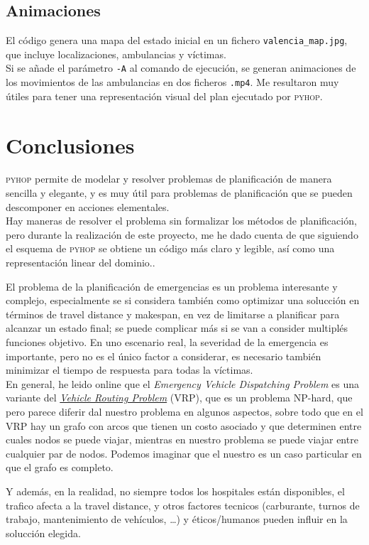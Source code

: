 \subsection{Animaciones}

El código genera una mapa del estado inicial en un fichero \texttt{valencia\_map.jpg}, que incluye localizaciones, ambulancias y víctimas.\\
Si se añade el parámetro \texttt{-A} al comando de ejecución, se generan animaciones de los movimientos de las ambulancias en dos ficheros \texttt{.mp4}.
Me resultaron muy útiles para tener una representación visual del plan ejecutado por \textsc{pyhop}.


\section{Conclusiones}

\textsc{pyhop} permite de modelar y resolver problemas de planificación de manera sencilla y elegante, y es muy útil para problemas de planificación que se pueden descomponer en acciones elementales.\\
Hay maneras de resolver el problema sin formalizar los métodos de planificación, pero durante la realización de este proyecto, me he dado cuenta de que siguiendo el esquema de \textsc{pyhop} se obtiene un código más claro y legible, así como una representación linear del dominio..

El problema de la planificación de emergencias es un problema interesante y complejo, especialmente se si considera también como optimizar una solucción en términos de travel distance y makespan, en vez de limitarse a planificar para alcanzar un estado final; se puede complicar más si se van a consider multiplés funciones objetivo.
En uno escenario real, la severidad de la emergencia es importante, pero no es el único factor a considerar, es necesario también minimizar el tiempo de respuesta para todas la víctimas.\\
En general, he leido online que el \textit{Emergency Vehicle Dispatching Problem} es una variante del \href{https://en.wikipedia.org/wiki/Vehicle_routing_problem}{\textit{Vehicle Routing Problem}} (VRP), que es un problema NP-hard, que pero parece diferir dal nuestro problema en algunos aspectos, sobre todo que en el VRP hay un grafo con arcos que tienen un costo asociado y que determinen entre cuales nodos se puede viajar, mientras en nuestro problema se puede viajar entre cualquier par de nodos. Podemos imaginar que el nuestro es un caso particular en que el grafo es completo.

Y además, en la realidad, no siempre todos los hospitales están disponibles, el trafico afecta a la travel distance, y otros factores tecnicos (carburante, turnos de trabajo, mantenimiento de vehículos, \dots) y éticos/humanos pueden influir en la solucción elegida.

